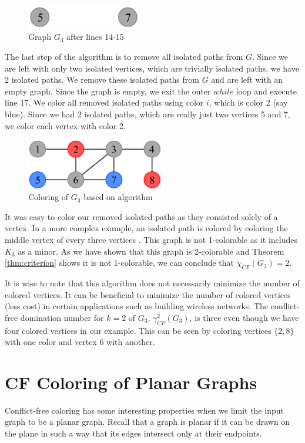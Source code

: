 \documentclass{sig-alternate}
\begin{document}
\begin{figure}[h]
	\centering
	\includegraphics[width=5cm]{../figures/algorithm1-step2.pdf}
	\caption{Graph $G_3$ after lines 14-15}\label{fig:algorithm1-step2}
\end{figure}


The last step of the algorithm is to remove all isolated paths from $G$. Since we are left with only two isolated vertices, which are trivially isolated paths, we have 2 isolated paths. We remove these isolated paths from $G$ and are left with an empty graph. Since the graph is empty, we exit the outer $while$ loop and execute line 17. We color all removed isolated paths using color $i$, which is color 2 (say blue). Since we had 2 isolated paths, which are really just two vertices 5 and 7, we color each vertex with color 2.

\begin{figure}[h]
	\centering
	\includegraphics[width=6cm]{../figures/algorithm1-step3.pdf}
	\caption{Coloring of $G_3$ based on algorithm}\label{fig:algorithm1-step3}
\end{figure}

It was easy to color our removed isolated paths as they consisted solely of a vertex. In a more complex example, an isolated path is colored by coloring the middle vertex of every three vertices \cite{abel2017three}. This graph is not 1-colorable as it includes $K_3$ as a minor. As we have shown that this graph is 2-colorable and Theorem \ref{thm:criterion} shows it is not 1-colorable, we can conclude that $\chi_{CF}(G_3) = 2$.

It is wise to note that this algorithm does not necessarily minimize the number of colored vertices. It can be beneficial to minimize the number of colored vertices (less cost) in certain applications such as building wireless networks. The conflict-free domination number for $k=2$ of $G_3$, $\gamma_{CF}^2(G_3)$, is three even though we have four colored vertices in our example. This can be seen by coloring vertices $\{2, 8\}$ with one color and vertex 6 with another.

\section{CF Coloring of Planar Graphs}
\label{sec:planar-coloring}
Conflict-free coloring has some interesting properties when we limit the input graph to be a planar graph. Recall that a graph is planar if it can be drawn on the plane in such a way that its edges intersect only at their endpoints.
\end{document}
